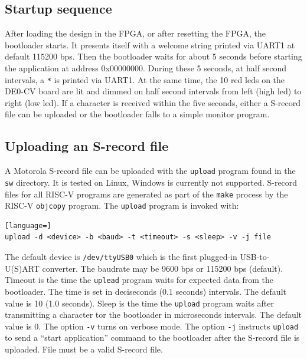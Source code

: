 \documentclass[12pt]{article}
\begin{document}
\subsection{Startup sequence}
After loading the design in the FPGA, or after resetting the FPGA, the bootloader starts. It presents itself with a welcome string printed via UART1 at default 115200 bps. Then the bootloader waits for about 5 seconds before starting the application at address 0x00000000. During these 5 seconds, at half second intervals, a \lstinline|*| is printed via UART1. At the same time, the 10 red leds on the DE0-CV board are lit and dimmed on half second intervals from left (high led) to right (low led). If a character is received within the five seconds, either a S-record file can be uploaded or the bootloader falls to a simple monitor program.

\subsection{Uploading an S-record file}
A Motorola S-record file can be uploaded with the \lstinline|upload| program found in the \lstinline|sw| directory. It is tested on Linux, Windows is currently not supported. S-record files for all RISC-V programs are generated as part of the \lstinline|make| process by the RISC-V \lstinline|objcopy| program. The \lstinline|upload| program is invoked with:

\begin{lstlisting}[language=]
upload -d <device> -b <baud> -t <timeout> -s <sleep> -v -j file
\end{lstlisting}

The default device is \lstinline|/dev/ttyUSB0| which is the first plugged-in USB-to-U(S)ART converter. The baudrate may be 9600 bps or 115200 bps (default). Timeout is the time the \lstinline|uplead| program waits for expected data from the bootloader. The time is set in deciseconds (0.1 seconds) intervals. The default value is 10 (1.0 seconds). Sleep is the time the \lstinline|upload| program waits after transmitting a character tor the bootloader in microseconds intervals. The default value is 0. The option \lstinline|-v| turns on verbose mode. The option \lstinline[]|-j| instructs \lstinline|upload| to send a ``start application'' command to the bootloader after the S-record file is uploaded. File must be a valid S-record file.
\end{document}
